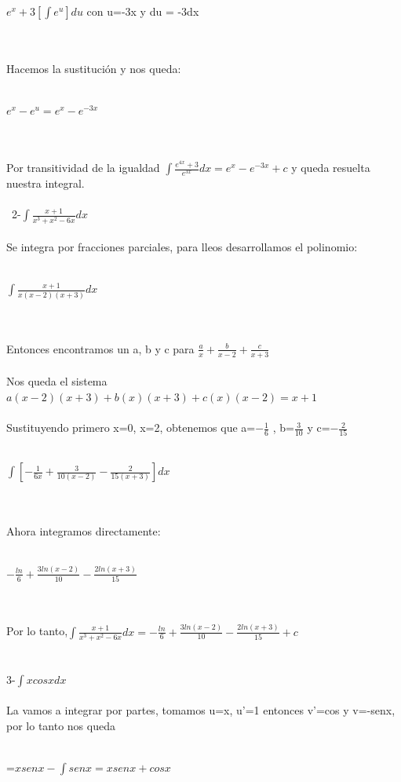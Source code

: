\documentclass[a4paper,10pt]{article}
\begin{document}
\centerline{$e^x + 3[\int e^u]du $ con u=-3x y du = -3dx}\\\\
Hacemos la sustitución y nos queda:\\\\
\centerline{$e^x - e^u = e^x - e^{-3x}$}\\\\
Por transitividad de la igualdad $\int \frac{e^{4x}+3}{e^{3x}} dx = e^x - e^{-3x} +c $ y queda resuelta nuestra integral.\\\\\
2-$\int \frac{x+1}{x^3 + x^2 -6x} dx $\\\\
Se integra por fracciones parciales, para lleos desarrollamos el polinomio:\\\\
\centerline{$\int \frac{x+1}{x(x-2)(x+3)} dx $}\\\\
Entonces encontramos un a, b y c para $\frac{a}{x} + \frac{b}{x-2} + \frac{c}{x+3}$\\\\
Nos queda el sistema $a(x-2)(x+3) + b(x)(x+3) + c(x)(x-2) = x+1$\\\\
Sustituyendo primero x=0, x=2, obtenemos que a=$-\frac{1}{6}$ , b=$\frac{3}{10}$ y c=$-\frac{2}{15}$\\\\
\centerline{$\int [-\frac{1}{6x} + \frac{3}{10(x-2)} - \frac{2}{15(x+3)}] dx $}\\\\
Ahora integramos directamente:\\\\
\centerline{$-\frac{ln}{6} + \frac{3ln(x-2)}{10} - \frac{2ln(x+3)}{15}$}\\\\
Por lo tanto,$\int \frac{x+1}{x^3 + x^2 -6x} dx  = -\frac{ln}{6} + \frac{3ln(x-2)}{10} - \frac{2ln(x+3)}{15} + c $\\\\\\
3-$\int xcosx dx$\\\\
La vamos a integrar por partes, tomamos u=x, u'=1 entonces v'=cos y v=-senx, por lo tanto nos queda\\\\
\centerline{=$xsenx - \int senx = xsenx + cosx$}\\\\
\end{document}
